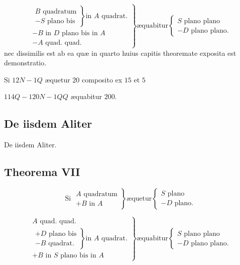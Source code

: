 \documentclass[11pt,a4paper]{article}
\begin{document}
\[ \left.\begin{array}{l} \left.\begin{array}{l} B \text{ quadratum} \\ - S \text{ plano bis} \end{array}\right\} \text{in } A \text{ quadrat.} \\ - B \text{ in } D \text{ plano bis in } A \\ - A \text{ quad. quad.} \end{array}\right\} \text{æquabitur} \left\{\begin{array}{l} S \text{ plano plano} \\ - D \text{ plano plano.} \end{array}\right. \]
nec dissimilis est ab ea quæ in quarto huius capitis theoremate exposita est demonstratio.

Si $12N - 1Q$ æquetur $20$ composito ex $15$ et $5$

$114Q - 120N - 1QQ$ æquabitur $200$.


\subsection*{De iisdem Aliter}

De iisdem Aliter.

\subsection*{Theorema VII}

\[ \text{Si } \left.\begin{array}{l} A \text{ quadratum} \\ + B \text{ in } A \end{array}\right\} \text{æquetur} \left\{\begin{array}{l} S \text{ plano} \\ - D \text{ plano.} \end{array}\right. \]

\[ \left.\begin{array}{l} A \text{ quad. quad.} \\ \left.\begin{array}{l} + D \text{ plano bis} \\ - B \text{ quadrat.} \end{array}\right\} \text{in } A \text{ quadrat.} \\ + B \text{ in } S \text{ plano bis in } A \end{array}\right\} \text{æquabitur} \left\{\begin{array}{l} S \text{ plano plano} \\ - D \text{ plano plano.} \end{array}\right. \]
\end{document}
